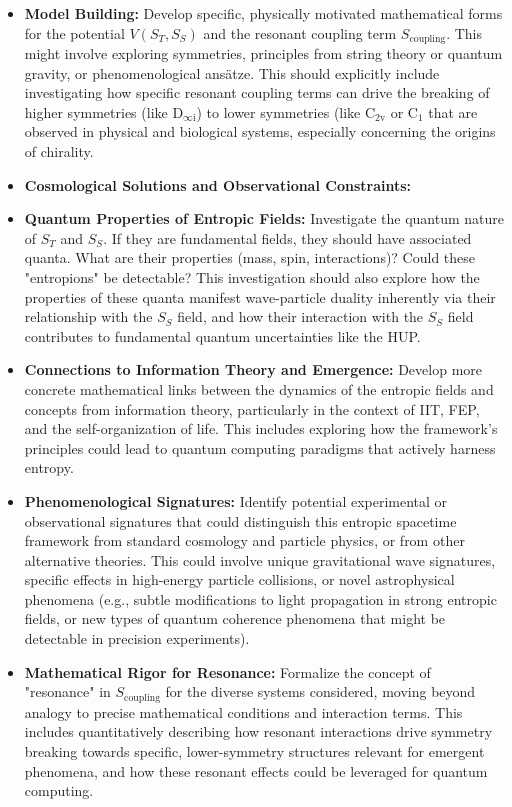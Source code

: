 \documentclass[11pt,a4paper]{article} %
\newcommand{\ST}{S_T}
\newcommand{\SSp}{S_S} %
\newcommand{\Scoupling}{S_{\text{coupling}}}
\begin{document}
\begin{itemize}
    \item \textbf{Model Building:} Develop specific, physically motivated mathematical forms for the potential $V(\ST,\SSp)$ and the resonant coupling term $\Scoupling$. This might involve exploring symmetries, principles from string theory or quantum gravity, or phenomenological ansätze. This should explicitly include investigating how specific resonant coupling terms can drive the breaking of higher symmetries (like $\text{D}_{\infty\text{i}}$) to lower symmetries (like $\text{C}_{2\text{v}}$ or $\text{C}_{1}$ that are observed in physical and biological systems, especially concerning the origins of chirality.
    \item \textbf{Cosmological Solutions and Observational Constraints:}
    \item \textbf{Quantum Properties of Entropic Fields:} Investigate the quantum nature of $\ST$ and $\SSp$. If they are fundamental fields, they should have associated quanta. What are their properties (mass, spin, interactions)? Could these "entropions" be detectable? This investigation should also explore how the properties of these quanta manifest wave-particle duality inherently via their relationship with the $\SSp$ field, and how their interaction with the $\SSp$ field contributes to fundamental quantum uncertainties like the HUP.
    \item \textbf{Connections to Information Theory and Emergence:} Develop more concrete mathematical links between the dynamics of the entropic fields and concepts from information theory, particularly in the context of IIT, FEP, and the self-organization of life. This includes exploring how the framework's principles could lead to quantum computing paradigms that actively harness entropy.
    \item \textbf{Phenomenological Signatures:} Identify potential experimental or observational signatures that could distinguish this entropic spacetime framework from standard cosmology and particle physics, or from other alternative theories. This could involve unique gravitational wave signatures, specific effects in high-energy particle collisions, or novel astrophysical phenomena (e.g., subtle modifications to light propagation in strong entropic fields, or new types of quantum coherence phenomena that might be detectable in precision experiments).
    \item \textbf{Mathematical Rigor for Resonance:} Formalize the concept of "resonance" in $\Scoupling$ for the diverse systems considered, moving beyond analogy to precise mathematical conditions and interaction terms. This includes quantitatively describing how resonant interactions drive symmetry breaking towards specific, lower-symmetry structures relevant for emergent phenomena, and how these resonant effects could be leveraged for quantum computing.

\end{itemize}
\end{document}
